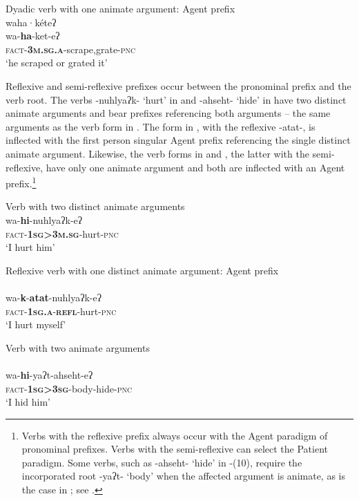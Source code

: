 \documentclass[output=paper]{langscibook}
\begin{document}
 

\ea%
    \label{ex:oneida:5}
    Dyadic verb with one animate argument: Agent prefix \\
    \glll waha·kéteʔ \\
    wa-\textbf{ha}-ket-eʔ\\
      \textsc{fact-}\textbf{\textsc{3m.sg.a}}-scrape,grate-\textsc{pnc} \\
    \glt  ‘he scraped or grated it’
  \z

Reflexive and semi-reflexive prefixes occur between the pronominal prefix and the verb root. The verbs {{}-nuhlyaʔk-} ‘hurt’ in  and {-ahseht-} ‘hide’ in  have two distinct animate arguments and bear prefixes referenc\-ing both arguments – the same arguments as the verb form in . The form in , with the reflexive {-atat-}, is inflected with the first person singular Agent prefix referencing the single distinct animate argument. Likewise, the verb forms in  and , the latter with the semi-reflexive, have only one animate argument and both are inflected with an Agent prefix.\footnote{Verbs with the reflexive prefix always occur with the Agent paradigm of pronominal prefixes. Verbs with the semi-reflexive can select the Patient paradigm. Some verbs, such as {{}-ahseht-} ‘hide’ in -(10), require the incorporated root {{}-yaʔt-} ‘body’ when the affected argument is animate, as is the case in ; see \citealt{MichelsonDoxtator2002}.}

\ea%
   \label{ex:oneida:6}
   Verb with two distinct animate arguments\\
    \gll wa-\textbf{hi}-nuhlyaʔk-eʔ\\
      \textsc{fact}-\textbf{\textsc{1sg>3m.sg}}-hurt-\textsc{pnc} \\
   \glt ‘I hurt him’
  \z
   

\ea%
    \label{ex:oneida:7}
    Reflexive verb with one distinct animate argument: Agent prefix\\
   \\
   wa-\textbf{k}-\textbf{atat}-nuhlyaʔk-eʔ\\
    \textsc{fact-}\textbf{\textsc{1sg.a}}\textsc{-}\textbf{\textsc{refl}}-hurt-\textsc{pnc} \\
   \glt ‘I hurt myself’
  \z

    
\ea%
   \label{ex:oneida:8}
  Verb with two animate arguments\\
 \\
  wa-\textbf{hi}-yaʔt-ahseht-eʔ\\
 \textsc{fact}-\textbf{\textsc{1sg>3sg}}-body-hide-\textsc{pnc} \\
  \glt ‘I hid him’
 \z
\end{document}
